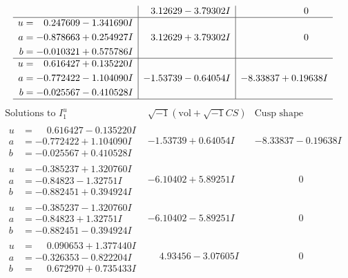 \documentclass[1p]{elsarticle_modified}
\theoremstyle{definition}
\newcommand{\I}{\sqrt{-1}}
\begin{document}
$$\begin{array}{c|c|c}
 & \phantom{-}3.12629 - 3.79302 I & \phantom{-0.000000 } 0 \\ \hline\begin{aligned}
u &= \phantom{-}0.247609 - 1.341690 I \\
a &= -0.878663 + 0.254927 I \\
b &= -0.010321 + 0.575786 I\end{aligned}
 & \phantom{-}3.12629 + 3.79302 I & \phantom{-0.000000 } 0 \\ \hline\begin{aligned}
u &= \phantom{-}0.616427 + 0.135220 I \\
a &= -0.772422 - 1.104090 I \\
b &= -0.025567 - 0.410528 I\end{aligned}
 & -1.53739 - 0.64054 I & -8.33837 + 0.19638 I\\
 \hline 
 \end{array}$$\newpage$$\begin{array}{c|c|c}  
\text{Solutions to }I^u_{1}& \I (\text{vol} + \sqrt{-1}CS) & \text{Cusp shape}\\
 \hline 
\begin{aligned}
u &= \phantom{-}0.616427 - 0.135220 I \\
a &= -0.772422 + 1.104090 I \\
b &= -0.025567 + 0.410528 I\end{aligned}
 & -1.53739 + 0.64054 I & -8.33837 - 0.19638 I \\ \hline\begin{aligned}
u &= -0.385237 + 1.320760 I \\
a &= -0.84823 - 1.32751 I \\
b &= -0.882451 + 0.394924 I\end{aligned}
 & -6.10402 + 5.89251 I & \phantom{-0.000000 } 0 \\ \hline\begin{aligned}
u &= -0.385237 - 1.320760 I \\
a &= -0.84823 + 1.32751 I \\
b &= -0.882451 - 0.394924 I\end{aligned}
 & -6.10402 - 5.89251 I & \phantom{-0.000000 } 0 \\ \hline\begin{aligned}
u &= \phantom{-}0.090653 + 1.377440 I \\
a &= -0.326353 - 0.822204 I \\
b &= \phantom{-}0.672970 + 0.735433 I\end{aligned}
 & \phantom{-}4.93456 - 3.07605 I & \phantom{-0.000000 } 0 \\ \hline\begin{aligned}

\end{aligned}
\end{array}$$
\end{document}
